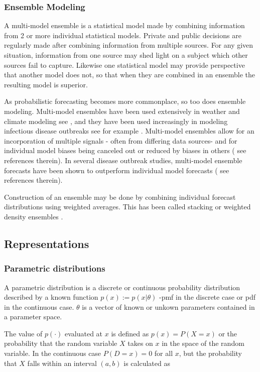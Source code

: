 \documentclass{article}\usepackage[]{graphicx}\usepackage[]{color}
\begin{document}
\subsubsection{Ensemble Modeling}
A multi-model ensemble is a statistical model made by combining information from
2 or more individual statistical models. Private and public decisions are 
regularly made after combining information from multiple sources. For any given
situation, information from one source may shed light on a subject which other
sources fail to capture. Likewise one statistical model may provide perspective
that another model does not, so that when they are combined in an ensemble the 
resulting model is superior.

As probabilistic forecasting becomes more commonplace, so too does ensemble 
modeling. Multi-model ensembles have been used extensively in weather and
climate modeling see \cite{baran2018combining}, 
and they have been used increasingly in modeling infectious disease outbreaks
see for example \cite{yamana2016superensemble}. 
Multi-model ensembles allow for an incorporation of multiple signals -
often from differing data sources- and for individual model biases being canceled
out or reduced by biases in others (\cite{reich2019accuracy} see references
therein). 
In several disease outbreak studies, multi-model ensemble forecasts have been 
shown to outperform individual model forecasts (\cite{cramer2021evaluation} see
references therein).

Construction of an ensemble may be done by combining individual forecast 
distributions using weighted averages. This has been called stacking 
\cite{wolpert1992stacked} or weighted density ensembles 
\cite{ray2018prediction}. 

\subsection{Representations}
\subsubsection{Parametric distributions}
\label{section:pardist}
A parametric distribution is a discrete or continuous probability distribution 
described by a known function $p(x) := p(x|\theta)$ -pmf in the discrete case or 
pdf in the continuous case. $\theta$ is a vector of known or unkown parameters 
contained in a parameter space. 

The value of $p(\cdot)$ evaluated at $x$ is defined as 
$p(x) = P(X = x)$ or the probability that the random variable $X$ takes
on $x$ in the space of the random variable. In the continuous case 
$P(D = x) = 0$ for all $x$, but the probability 
that $X$ falls within an interval $(a,b)$ is calculated as
\end{document}
